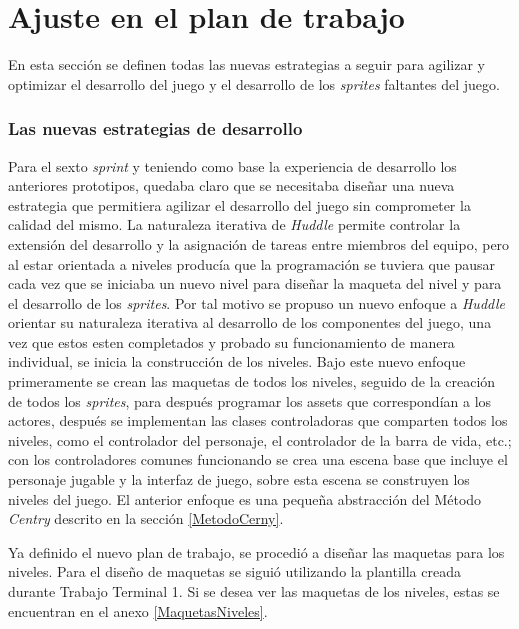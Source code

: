 \section{Ajuste en el plan de trabajo}
En esta sección se definen todas las nuevas estrategias a seguir para agilizar y 
optimizar el desarrollo del juego y el desarrollo de los \textit{sprites} 
faltantes del juego.

\subsubsection{Las nuevas estrategias de desarrollo}
Para el sexto \textit{sprint} y teniendo como base la experiencia de desarrollo los 
anteriores prototipos, quedaba claro que se necesitaba diseñar una nueva estrategia 
que permitiera agilizar el desarrollo del juego sin comprometer la calidad del 
mismo. La naturaleza iterativa de \textit{Huddle} permite controlar la extensión del 
desarrollo y la asignación de tareas entre miembros del equipo, pero al estar 
orientada a niveles producía que la programación se tuviera que pausar cada vez 
que se iniciaba un nuevo nivel para diseñar la maqueta del nivel y para el 
desarrollo de los \textit{sprites}. Por tal motivo se propuso un nuevo enfoque a 
\textit{Huddle} 
orientar su naturaleza iterativa al desarrollo de los componentes del juego, 
una vez que estos esten completados y probado su funcionamiento de manera 
individual, se inicia la construcción de los niveles. Bajo este nuevo enfoque 
primeramente se crean las maquetas de todos los niveles, seguido de la creación 
de todos los \textit{sprites}, para después programar los assets que correspondían a 
los actores, después se implementan las clases controladoras que comparten todos 
los niveles, como el controlador del personaje, el controlador de la barra de vida, 
etc.; con los controladores comunes funcionando se crea una escena base que incluye 
el personaje jugable y la interfaz de juego, sobre esta escena se construyen los 
niveles del juego. El anterior enfoque es una pequeña abstracción del Método \textit{Centry} descrito en la sección \ref{MetodoCerny}.
\\
\par
Ya definido el nuevo plan de trabajo, se procedió a diseñar las maquetas para los 
niveles. Para el diseño de maquetas se siguió utilizando la plantilla creada 
durante Trabajo Terminal 1. Si se desea ver las maquetas de los niveles, estas se 
encuentran en el anexo \ref{MaquetasNiveles}. 
\\
\par
